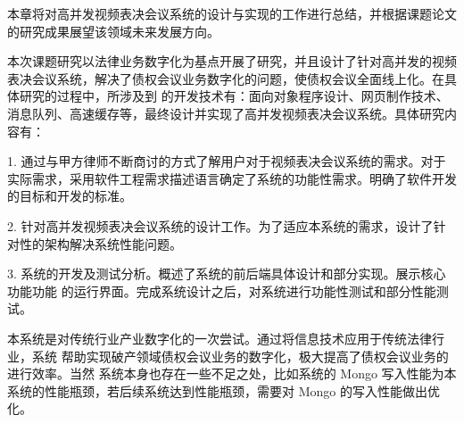 
\begin{summary}
本章将对高并发视频表决会议系统的设计与实现的工作进行总结，并根据课题论文的研究成果展望该领域未来发展方向。

本次课题研究以法律业务数字化为基点开展了研究，并且设计了针对高并发的视频表决会议系统，解决了债权会议业务数字化的问题，使债权会议全面线上化。在具体研究的过程中，所涉及到
的开发技术有：面向对象程序设计、网页制作技术、消息队列、高速缓存等，最终设计并实现了高并发视频表决会议系统。具体研究内容有：

1. 通过与甲方律师不断商讨的方式了解用户对于视频表决会议系统的需求。对于实际需求，采用软件工程需求描述语言确定了系统的功能性需求。明确了软件开发的目标和开发的标准。

2. 针对高并发视频表决会议系统的设计工作。为了适应本系统的需求，设计了针对性的架构解决系统性能问题。

3. 系统的开发及测试分析。概述了系统的前后端具体设计和部分实现。展示核心功能功能
的运行界面。完成系统设计之后，对系统进行功能性测试和部分性能测试。

本系统是对传统行业产业数字化的一次尝试。通过将信息技术应用于传统法律行业，系统
帮助实现破产领域债权会议业务的数字化，极大提高了债权会议业务的进行效率。当然
系统本身也存在一些不足之处，比如系统的 Mongo 写入性能为本系统的性能瓶颈，若后续系统达到性能瓶颈，需要对 Mongo 的写入性能做出优化。

\end{summary}
